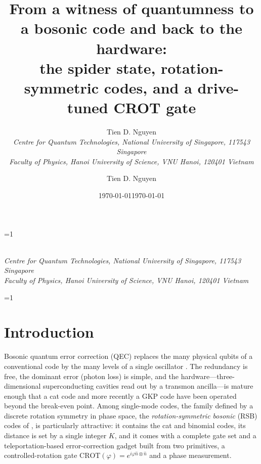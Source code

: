 \documentclass[aps,pra,reprint,superscriptaddress,amsmath,amssymb,nofootinbib]{revtex4-2}
\newcommand{\revtexfallback}{0}%
\newcommand{\revtexfallback}{1}%
\newcommand{\affiliation}[1]{\\[-0.2em]{\small\itshape #1}}
\newcommand{\n}{\hat n}
\begin{document}
\title{From a witness of quantumness to a bosonic code and back to the hardware:\\
the spider state, rotation-symmetric codes, and a drive-tuned CROT gate}

\ifnum\revtexfallback=1
\author{Tien D. Nguyen\affiliation{Centre for Quantum Technologies, National University of Singapore, 117543 Singapore}\affiliation{Faculty of Physics, Hanoi University of Science, VNU Hanoi, 120401 Vietnam}}
\else
\author{Tien D. Nguyen}
\affiliation{Centre for Quantum Technologies, National University of Singapore, 117543 Singapore}
\affiliation{Faculty of Physics, Hanoi University of Science, VNU Hanoi, 120401 Vietnam}
\fi

\ifnum\revtexfallback=1
  \date{\today}
  \twocolumn[
  \begin{@twocolumnfalse}
  \maketitle
  \begin{abstract}
  
  \end{abstract}
  \vspace{1em}
  \end{@twocolumnfalse}
  ]
\else
  \date{\today}
  \begin{abstract}
  
  \end{abstract}
  \maketitle
\fi

\section{Introduction}
Bosonic quantum error correction (QEC) replaces the many physical qubits of a
conventional code by the many levels of a single oscillator
\cite{chuang1997,gkp2001,joshi2021}. The redundancy is free, the dominant error
(photon loss) is simple, and the hardware---three-dimensional superconducting
cavities read out by a transmon ancilla---is mature enough that a cat code
\cite{ofek2016} and more recently a GKP code \cite{sivak2023} have been
operated beyond the break-even point. Among single-mode codes, the family
defined by a discrete rotation symmetry in phase space, the
\emph{rotation-symmetric bosonic} (RSB) codes of \cite{grimsmo2020}, is particularly attractive: it contains the cat
\cite{mirrahimi2014} and binomial \cite{michael2016} codes, its distance is set
by a single integer $K$, and it comes with a complete gate set and a
teleportation-based error-correction gadget built from two primitives, a
controlled-rotation gate $\mathrm{CROT}(\varphi)=e^{i\varphi\n\otimes\n}$ and a
phase measurement.
\end{document}
